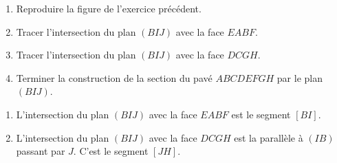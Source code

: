 \documentclass{cornouaille}
\begin{document}
\begin{exercice}


  \begin{enumerate}
  \item Reproduire la figure de l'exercice précédent.
  \item Tracer l'intersection du plan $(BIJ)$ avec la face $EABF$.
  \item Tracer l'intersection du plan $(BIJ)$ avec la face $DCGH$.
  \item Terminer la construction de la section du pavé $ABCDEFGH$ par
    le plan $(BIJ)$.
  \end{enumerate}
\end{exercice}
\begin{solution}
  \begin{enumerate}
\item L'intersection du plan $(BIJ)$ avec la face $EABF$ est le segment $[BI]$.
\item L'intersection du plan $(BIJ)$ avec la face $DCGH$ est la
  parallèle à $(IB)$ passant par $J$. C'est le segment $[JH]$.


\end{enumerate}
\end{solution}
\end{document}
